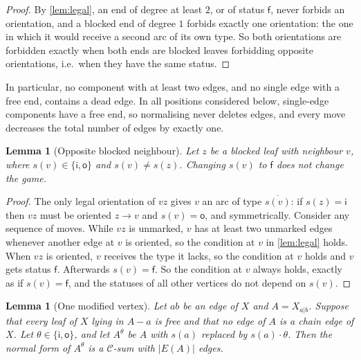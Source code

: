 \documentclass[11pt]{amsart}
\newtheorem{lemma}[theorem]{Lemma}
\theoremstyle{definition}
\theoremstyle{remark}
\newcommand{\si}{\mathsf{i}}
\newcommand{\so}{\mathsf{o}}
\newcommand{\sff}{\mathsf{f}}
\begin{document}
\begin{proof}
By \cref{lem:legal}, an end of degree at least $2$, or of status $\sff$, never forbids an
orientation, and a blocked end of degree $1$ forbids exactly one orientation: the one in which it
would receive a second arc of its own type. So both orientations are forbidden exactly when both
ends are blocked leaves forbidding opposite orientations, i.e.\ when they have the same status.
\end{proof}

In particular, no component with at least two edges, and no single edge with a free end, contains
a dead edge. In all positions considered below, single-edge components have a free end, so
normalising never deletes edges, and every move decreases the total number of edges by exactly one.

\begin{lemma}[Opposite blocked neighbour]\label{lem:oppblocked}
Let $z$ be a blocked leaf with neighbour $v$, where $s(v)\in\{\si,\so\}$ and $s(v)\neq s(z)$.
Changing $s(v)$ to $\sff$ does not change the game.
\end{lemma}

\begin{proof}
The only legal orientation of $vz$ gives $v$ an arc of type $\overline{s(v)}$: if $s(z)=\si$ then
$vz$ must be oriented $z\to v$ and $s(v)=\so$, and symmetrically. Consider any sequence of moves.
While $vz$ is unmarked, $v$ has at least two unmarked edges whenever another edge at $v$ is
oriented, so the condition at $v$ in \cref{lem:legal} holds. When $vz$ is oriented, $v$ receives
the type it lacks, so the condition at $v$ holds and $v$ gets status $\sff$. Afterwards $s(v)=\sff$.
So the condition at $v$ always holds, exactly as if $s(v)=\sff$, and the statuses of all other
vertices do not depend on $s(v)$.
\end{proof}

\begin{lemma}[One modified vertex]\label{lem:onemod}
Let $ab$ be an edge of $X$ and $A=X_{a|b}$. Suppose that every leaf of $X$ lying in $A-a$ is free
and that no edge of $A$ is a chain edge of $X$. Let $\theta\in\{\si,\so\}$, and let $A^\theta$ be
$A$ with $s(a)$ replaced by $s(a)\cdot\theta$. Then the normal form of $A^\theta$ is a
$\mathcal C$-sum with $|E(A)|$ edges.
\end{lemma}
\end{document}
